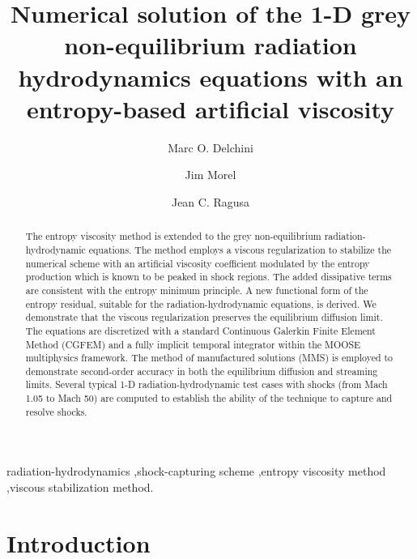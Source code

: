 \documentclass[review]{elsarticle}
\begin{document}
%
\begin{frontmatter}
%
\title{Numerical solution of the 1-D grey non-equilibrium radiation hydrodynamics equations with an entropy-based artificial viscosity}
\author{Marc O. Delchini}

\author{Jim Morel}

\author{Jean C. Ragusa}

\address[label1]{Department of Nuclear Engineering, Texas A\&M University, College Station, TX 77843, USA }

\begin{abstract}
The entropy viscosity method is extended to the grey non-equilibrium radiation-hydrodynamic equations. 
The method employs a viscous regularization to stabilize the numerical scheme with an artificial viscosity coefficient modulated by the entropy production which is known to be peaked in shock regions. The added dissipative terms are consistent with the entropy minimum principle.  A new functional form of the entropy residual, suitable for the radiation-hydrodynamic equations, is derived. We demonstrate that the viscous regularization preserves the equilibrium diffusion limit. The equations are discretized with a standard Continuous Galerkin Finite Element Method (CGFEM) and a fully implicit temporal integrator within the MOOSE multiphysics framework. The method of manufactured solutions (MMS) is employed to demonstrate second-order accuracy in both the equilibrium diffusion and streaming limits. Several typical 1-D radiation-hydrodynamic test cases with shocks (from Mach 1.05 to Mach 50) are computed to establish the ability of the technique to capture and resolve shocks.
\end{abstract}
%
\begin{keyword}
radiation-hydrodynamics \sep shock-capturing scheme \sep entropy viscosity method \sep viscous stabilization method.
\end{keyword}
%
\end{frontmatter}
%
\linenumbers
%
\section{Introduction}
\label{sec:section1}
\end{document}
